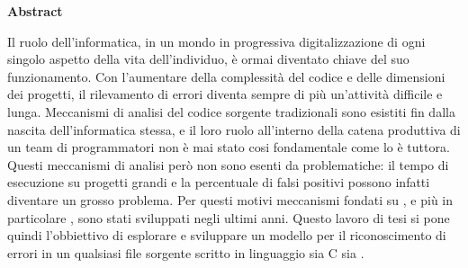 \makeatletter
\if@titlepage
  \newenvironment{abstract}{%
      \titlepage
      \null\vfil
      \@beginparpenalty\@lowpenalty
      \begin{center}%
        \bfseries Abstract
        \@endparpenalty\@M
      \end{center}}%
     {\par\vfil\null\endtitlepage}
\else
  \newenvironment{abstract}{%
      \if@twocolumn
        \section*{\abstractname}%
      \else
        \small
        \begin{center}%
          {\bfseries \abstractname\vspace{-.5em}\vspace{\z@}}%
        \end{center}%
        \quotation
      \fi}
      {\if@twocolumn\else\endquotation\fi}
\fi
\makeatother

\begin{abstract}
  Il ruolo dell'informatica, in un mondo in progressiva digitalizzazione di ogni singolo aspetto della vita dell'individuo, è ormai diventato chiave del suo funzionamento. 
  Con l'aumentare della complessità del codice e delle dimensioni dei progetti, il rilevamento di errori diventa sempre di più un'attività difficile e lunga. Meccanismi di analisi
  del codice sorgente tradizionali sono esistiti fin dalla nascita dell'informatica stessa, e il loro ruolo all'interno della catena produttiva di un team di programmatori non è mai stato cosi fondamentale come 
  lo è tuttora. Questi meccanismi di analisi però non sono esenti da problematiche: il tempo di esecuzione su progetti grandi e la percentuale di falsi positivi possono infatti diventare un grosso problema.
  Per questi motivi meccanismi fondati su \ML, e più in particolare \DL, sono stati sviluppati negli ultimi anni. Questo lavoro di tesi si pone quindi l'obbiettivo di esplorare e sviluppare un modello per il riconoscimento di errori
  in un qualsiasi file sorgente scritto in linguaggio sia C sia \CC.


\end{abstract}